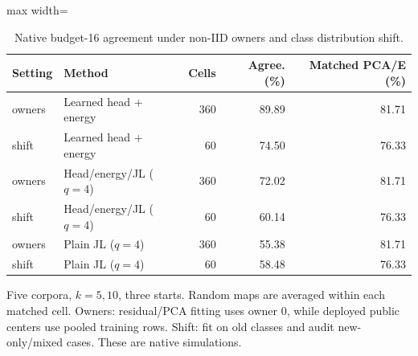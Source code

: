 \begin{table}[tp]
\caption{Native budget-16 agreement under non-IID owners and class distribution shift.}\label{tab:reuse-shift}
\centering\small
\begin{adjustbox}{max width=\textwidth}
\begin{tabular}{@{}llrrr@{}}
\toprule
Setting & Method & Cells & Agree. (\%) & Matched PCA/E (\%) \\
\midrule
owners & Learned head + energy & 360 & 89.89 & 81.71 \\
shift & Learned head + energy & 60 & 74.50 & 76.33 \\
owners & Head/energy/JL ($q=4$) & 360 & 72.02 & 81.71 \\
shift & Head/energy/JL ($q=4$) & 60 & 60.14 & 76.33 \\
owners & Plain JL ($q=4$) & 360 & 55.38 & 81.71 \\
shift & Plain JL ($q=4$) & 60 & 58.48 & 76.33 \\
\bottomrule
\end{tabular}
\end{adjustbox}
\par\smallskip\begin{minipage}{0.98\textwidth}\footnotesize Five corpora, $k=5,10$, three starts. Random maps are averaged within each matched cell. Owners: residual/PCA fitting uses owner 0, while deployed public centers use pooled training rows. Shift: fit on old classes and audit new-only/mixed cases. These are native simulations.\end{minipage}
\end{table}
